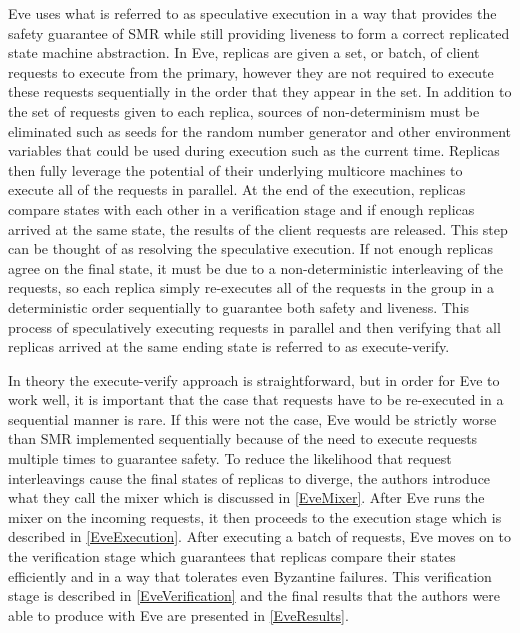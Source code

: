 \documentclass[11pt, oneside]{report}
\begin{document}
Eve uses what is referred to as speculative execution \cite{eve, zyz} in a way that provides the safety guarantee of SMR while still providing liveness to form a correct replicated state machine abstraction. 
In Eve, replicas are given a set, or batch, of client requests to execute from the primary, however they are not required to execute these requests sequentially in the order that they appear in the set. 
In addition to the set of requests given to each replica, sources of non-determinism must be  eliminated such as seeds for the random number generator and other environment variables that could be used during execution such as the current time.
Replicas then fully leverage the potential of their underlying multicore machines to execute all of the requests in parallel. 
At the end of the execution, replicas compare states with each other in a verification stage and if enough replicas arrived at the same state, the results of the client requests are released. 
This step can be thought of as resolving the speculative execution. 
If not enough replicas agree on the final state, it must be due to a non-deterministic interleaving of the requests, so each replica simply re-executes all of the requests in the group in a deterministic order sequentially to guarantee both safety and liveness. 
This process of speculatively executing requests in parallel and then verifying that all replicas arrived at the same ending state is referred to as execute-verify.

In theory the execute-verify approach is straightforward, but in order for Eve to work well, it is important that the case that requests have to be re-executed in a sequential manner is rare. 
If this were not the case, Eve would be strictly worse than SMR implemented sequentially because of the need to execute requests multiple times to guarantee safety. 
To reduce the likelihood that request interleavings cause the final states of replicas to diverge, the authors introduce what they call the mixer which is discussed in \ref{EveMixer}. 
After Eve runs the mixer on the incoming requests, it then proceeds to the execution stage which is described in \ref{EveExecution}. 
After executing a batch of requests, Eve moves on to the verification stage which guarantees that replicas compare their states efficiently and in a way that tolerates even Byzantine failures. 
This verification stage is described in \ref{EveVerification} and the final results that the authors were able to produce with Eve are presented in \ref{EveResults}.
\end{document}
